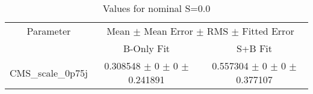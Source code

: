 \begin{table}
\centering
\caption{Values for nominal S=0.0}
\begin{tabular}{ccc}
\toprule
Parameter & \multicolumn{2}{c}{Mean $\pm$ Mean Error $\pm$ RMS $\pm$ Fitted Error}\\
 & B-Only Fit & S+B Fit\\
\midrule
CMS\_scale\_0p75j & \num{0.308548} $\pm$ \num{0} $\pm$ \num{0} $\pm$ \num{0.241891} & \num{0.557304} $\pm$ \num{0} $\pm$ \num{0} $\pm$ \num{0.377107}\\
\bottomrule
\end{tabular}
\end{table}